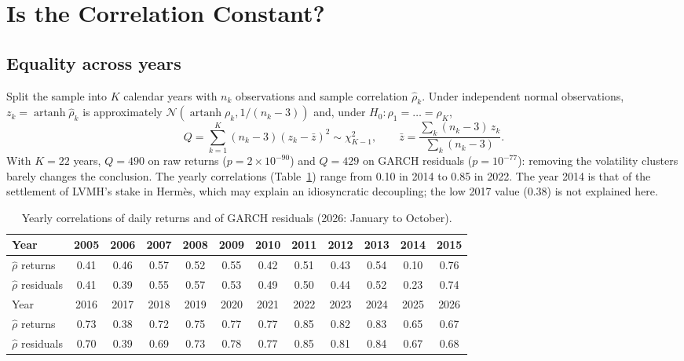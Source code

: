 \documentclass[11pt,a4paper]{article}
\DeclareMathOperator{\artanh}{artanh}
\begin{document}
\section{Is the Correlation Constant?}\label{sec:constancy}

\subsection{Equality across years}
Split the sample into $K$ calendar years with $n_k$ observations and sample correlation $\hat\rho_k$. Under
independent normal observations, $z_k = \artanh\hat\rho_k$ is approximately $\mathcal N(\artanh\rho_k, 1/(n_k - 3))$
and, under $H_0: \rho_1 = \dots = \rho_K$,
\begin{equation}
Q = \sum_{k=1}^K (n_k - 3)(z_k - \bar z)^2 \sim \chi^2_{K-1}, \qquad
\bar z = \frac{\sum_k (n_k - 3)\, z_k}{\sum_k (n_k - 3)}.
\end{equation}
With $K = 22$ years, $Q = 490$ on raw returns ($p = 2\times10^{-90}$) and $Q = 429$ on GARCH residuals
($p = 10^{-77}$): removing the volatility clusters barely changes the conclusion. The yearly correlations
(Table~\ref{tab:yearly}) range from 0.10 in 2014 to 0.85 in 2022. The year 2014 is that of the settlement of LVMH's
stake in Hermès, which may explain an idiosyncratic decoupling; the low 2017 value (0.38) is not explained here.

\begin{table}[h]
\centering
\small
\begin{tabular}{@{}lccccccccccc@{}}
\toprule
Year & 2005 & 2006 & 2007 & 2008 & 2009 & 2010 & 2011 & 2012 & 2013 & 2014 & 2015 \\
\midrule
$\hat\rho$ returns   & 0.41 & 0.46 & 0.57 & 0.52 & 0.55 & 0.42 & 0.51 & 0.43 & 0.54 & 0.10 & 0.76 \\
$\hat\rho$ residuals & 0.41 & 0.39 & 0.55 & 0.57 & 0.53 & 0.49 & 0.50 & 0.44 & 0.52 & 0.23 & 0.74 \\
\midrule
Year & 2016 & 2017 & 2018 & 2019 & 2020 & 2021 & 2022 & 2023 & 2024 & 2025 & 2026 \\
\midrule
$\hat\rho$ returns   & 0.73 & 0.38 & 0.72 & 0.75 & 0.77 & 0.77 & 0.85 & 0.82 & 0.83 & 0.65 & 0.67 \\
$\hat\rho$ residuals & 0.70 & 0.39 & 0.69 & 0.73 & 0.78 & 0.77 & 0.85 & 0.81 & 0.84 & 0.67 & 0.68 \\
\bottomrule
\end{tabular}
\caption{Yearly correlations of daily returns and of GARCH residuals (2026: January to October).}
\label{tab:yearly}
\end{table}
\end{document}

